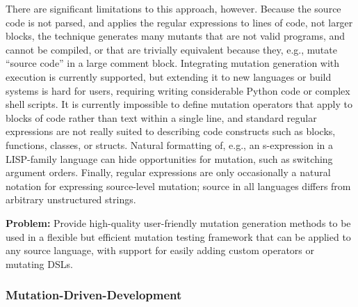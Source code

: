 There are significant limitations to this approach, however.  Because the source code is not parsed, and applies the regular expressions to lines of code, not larger blocks, the technique generates many mutants that are not valid programs, and cannot be compiled, or that are trivially equivalent because they, e.g., mutate ``source code'' in a large comment block.  Integrating mutation generation with execution is currently supported, but extending it to new languages or build systems is hard for users, requiring writing considerable Python code or complex shell scripts.  It is currently impossible to define mutation operators that apply to blocks of code rather than text within a single line, and standard regular expressions are not really suited to describing code constructs such as blocks, functions, classes, or structs.  Natural formatting of, e.g., an s-expression in a LISP-family language can hide opportunities for mutation, such as switching argument orders.  Finally, regular expressions are only occasionally a natural notation for expressing source-level mutation; source in all languages differs from arbitrary unstructured strings.

\begin{framed}
{\bf Problem:}  Provide high-quality user-friendly mutation generation methods to be used in a flexible but efficient mutation testing framework that can be applied to any source language, with support for easily adding custom operators or mutating DSLs.
\end{framed}

\subsubsection{Mutation-Driven-Development}


